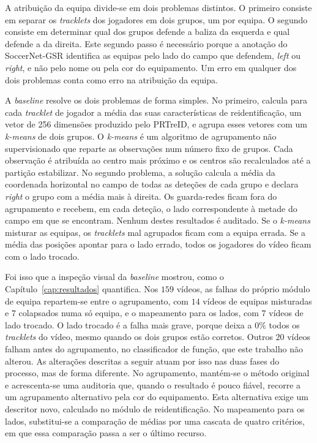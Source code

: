 A atribuição da equipa divide-se em dois problemas distintos. O primeiro consiste em separar os \emph{tracklets} dos jogadores em dois grupos, um por equipa. O segundo consiste em determinar qual dos grupos defende a baliza da esquerda e qual defende a da direita. Este segundo passo é necessário porque a anotação do SoccerNet-GSR identifica as equipas pelo lado do campo que defendem, \emph{left} ou \emph{right}, e não pelo nome ou pela cor do equipamento. Um erro em qualquer dos dois problemas conta como erro na atribuição da equipa.

A \emph{baseline} resolve os dois problemas de forma simples. No primeiro, calcula para cada \emph{tracklet} de jogador a média das suas características de reidentificação, um vetor de 256 dimensões produzido pelo PRTreID, e agrupa esses vetores com um \emph{k-means} de dois grupos. O \emph{k-means} é um algoritmo de agrupamento não supervisionado que reparte as observações num número fixo de grupos. Cada observação é atribuída ao centro mais próximo e os centros são recalculados até a partição estabilizar. No segundo problema, a solução calcula a média da coordenada horizontal no campo de todas as deteções de cada grupo e declara \emph{right} o grupo com a média mais à direita. Os guarda-redes ficam fora do agrupamento e recebem, em cada deteção, o lado correspondente à metade do campo em que se encontram. Nenhum destes resultados é auditado. Se o \emph{k-means} misturar as equipas, os \emph{tracklets} mal agrupados ficam com a equipa errada. Se a média das posições apontar para o lado errado, todos os jogadores do vídeo ficam com o lado trocado.

Foi isso que a inspeção visual da \emph{baseline} mostrou, como o Capítulo~\ref{cap:resultados} quantifica. Nos $159$ vídeos, as falhas do próprio módulo de equipa repartem-se entre o agrupamento, com $14$ vídeos de equipas misturadas e $7$ colapsados numa só equipa, e o mapeamento para os lados, com $7$ vídeos de lado trocado. O lado trocado é a falha mais grave, porque deixa a $0\%$ todos os \emph{tracklets} do vídeo, mesmo quando os dois grupos estão corretos. Outros $20$ vídeos falham antes do agrupamento, no classificador de função, que este trabalho não alterou. As alterações descritas a seguir atuam por isso nas duas fases do processo, mas de forma diferente. No agrupamento, mantém-se o método original e acrescenta-se uma auditoria que, quando o resultado é pouco fiável, recorre a um agrupamento alternativo pela cor do equipamento. Esta alternativa exige um descritor novo, calculado no módulo de reidentificação. No mapeamento para os lados, substitui-se a comparação de médias por uma cascata de quatro critérios, em que essa comparação passa a ser o último recurso.


